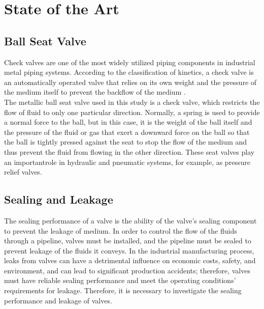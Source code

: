 \chapter{State of the Art}
\label{ch:State of the Art}

\section{Ball Seat Valve}
\label{Ball Seat Valve}

Check valves are one of the most widely utilized piping components in industrial metal piping systems. 
According to the classification of kinetics, a check valve is an automatically operated valve that
relies on its own weight and the pressure of the medium itself to prevent the backflow 
of the medium \cite{kineticsValve}. \\

The metallic ball seat valve used in this study is a check valve, which restricts the 
flow of fluid to only one particular direction. Normally, a spring is used to provide 
a normal force to the ball, but in this case, it is the weight of the ball itself and
 the pressure of the fluid or gas that exert a downward force on the ball so that the 
 ball is tightly pressed against the seat to stop the flow of the medium and thus 
 prevent the fluid from flowing in the other direction. These seat valves play an 
 importantrole in hydraulic and pneumatic systems, for example, as pressure 
 relief valves.\\



\section{Sealing and Leakage}
\label{Sealing and Leakage}
The sealing performance of a valve is the ability of the valve's sealing component to prevent the leakage 
of medium. In order to control the flow of the fluids through a pipeline, valves must be installed, and 
the pipeline must be sealed to prevent leakage of the fluids it conveys. In the industrial manufacturing 
process, leaks from valves can have a detrimental influence on economic costs, safety, and environment, 
and can lead to significant production accidents; therefore, valves must have reliable sealing performance 
and meet the operating conditions' requirements 
for leakage. Therefore, it is necessary to investigate the sealing performance and leakage of valves.\\

